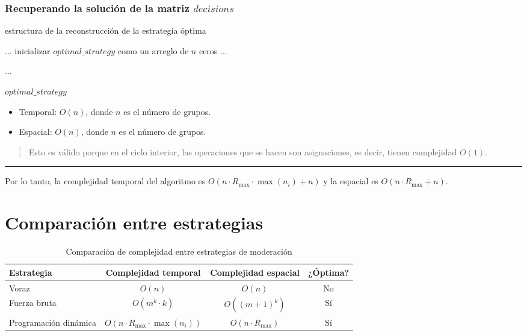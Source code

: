 \subsubsection{Recuperando la solución de la matriz $decisions$}

\begin{algorithm}[H]
	\caption{estructura de la reconstrucción de la estrategia óptima}
	\begin{algorithmic}[1]
		\State ...
		\State inicializar $optimal\_strategy$ como un arreglo de $n$ ceros
		\State ...

			\State ...
		\EndFor

		\State \Return $optimal\_strategy$
	\end{algorithmic}
\end{algorithm}

\begin{itemize}
	\item Temporal: $O(n)$, donde $n$ es el número de grupos.

	\item Espacial: $O(n)$, donde $n$ es el número de grupos.
\end{itemize}

\begin{quote}
	Esto es válido porque en el ciclo interior, las operaciones que se hacen son asignaciones, es decir, tienen complejidad $O(1)$.
\end{quote}

\hrule

Por lo tanto, la complejidad temporal del algoritmo es $O(n \cdot R_{ \max } \cdot \max(n_i) + n)$ y la espacial es $O(n \cdot R_{ \max } + n)$.

\section{Comparación entre estrategias}

\begin{table}[H]
	\centering
	\caption{Comparación de complejidad entre estrategias de moderación}
	\begin{tabular}{|l|c|c|c|}
		\hline
		\textbf{Estrategia} & \textbf{Complejidad temporal} & \textbf{Complejidad espacial} & \textbf{¿Óptima?} \\ \hline
		Voraz                 & $O(n)$                                  & $O(n)$                  & No \\
		Fuerza bruta          & $O(m^k \cdot k)$                        & $O((m + 1)^k)$          & Sí \\
		Programación dinámica & $O(n \cdot R_{ \max } \cdot \max(n_i))$ & $O(n \cdot R_{ \max })$ & Sí \\
	\hline
	\end{tabular}
\end{table}

